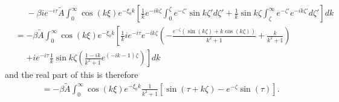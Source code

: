 \documentclass[12pt]{article}
\begin{document}
\begin{align*}
&\phantom{=} -\beta i e^{-i\tau} \tilde{A} \int_{0}^{\infty} \cos\left(k\xi \right) e^{-\xi_0 k} \left[\frac{1}{k}e^{-i k \zeta} \int_0^\zeta e^{-\zeta'}  \sin k\zeta' d\zeta' + \frac{1}{k}\sin k \zeta \int_\zeta^\infty e^{-\zeta'} e^{-ik\zeta'} d\zeta' \right] dk \\ 
& = -\beta \tilde{A} \int_{0}^{\infty} \cos\left(k\xi \right) e^{-\xi_0 k} \left[\frac{1}{k} i e^{-i\tau} e^{-i k \zeta} \left(-\frac{e^{-\zeta}\left(\sin\left(k\zeta\right) + k\cos\left(k\zeta\right)\right)}{k^2+1} + \frac{k}{k^2+1} \right) \right. \\ &\phantom{=} \left. + i e^{-i\tau} \frac{1}{k}\sin k \zeta \left( \frac{1-ik}{k^2+1} e^{\left(-i k - 1\right)\zeta} \right) \right] dk
\end{align*}
and the real part of this is therefore
\begin{align*}
& = -\beta \tilde{A} \int_{0}^{\infty} \cos\left(k\xi \right) e^{-\xi_0 k} \frac{1}{k^2+1} \left[\sin\left(\tau +k\zeta \right)-{e}^{-\zeta}\sin\left(\tau \right) \right].
\end{align*}
\end{document}
